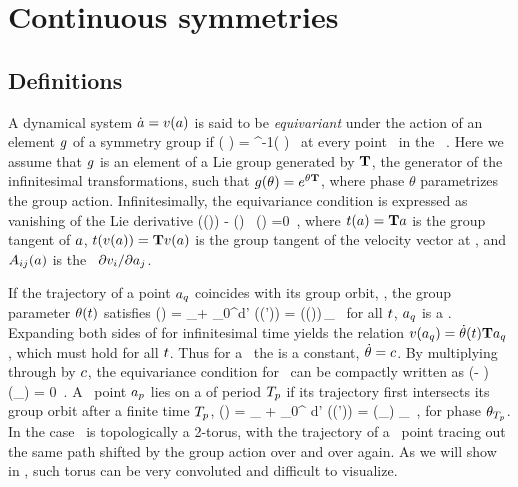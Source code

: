 \section{Continuous symmetries}
\label{s:symm}

\subsection{Definitions}
\label{s:Definitions}

A dynamical system $\dot{a}=v(a)$ is said to be
\emph{equivariant} under the action of an element $g$ of a
symmetry group if
\beq
	\vel( \ssp ) =  \LieEl^{-1}\vel( \LieEl \ssp )
	\,
at every point \ssp\ in the \statesp\ \pS. Here we assume that $g$
is an element of a Lie group generated by $\mathbf{T}$, the generator of the
infinitesimal transformations, such that $g(\theta) = e^{\theta
\mathbf{T}}$, where phase $\theta$ parametrizes the group action.
Infinitesimally, the equivariance condition
 is expressed as vanishing of
the Lie derivative
\beq
  \groupTan(\vel(\ssp))  - \Mvar(\ssp) \, \groupTan(\ssp) =0
  \,,
where
$ t(a) = \mathbf{T} a $ is the group tangent of $a$,
$ t(v(a)) = \mathbf{T} v(a) $ is the group tangent of
the velocity vector at \ssp,
and $A_{ij}(a)$ is the \stabmat\
${\partial v_i}/{\partial a_j}$.

If the trajectory of a point $a_q$ coincides with its group
orbit, \ie, the group parameter $\theta (t)$ satisfies
\beq
\ssp (\zeit)
    = \ssp_\stagn + \int_0^\zeit \!\!d\zeit' \vel(\ssp (\zeit'))
    = \LieEl (\theta (\zeit))\,\ssp_\stagn
  \,
for all $t$, $a_q$ is a \emph{\reqv}. Expanding
both sides of  for infinitesimal time yields the
relation $v(a_q) = \dot{\theta}(t) \mathbf{T} a_q$, which
must hold for all $t$. Thus for a \reqv\ the  \emph{\phaseVel}
is a constant, $\dot{\theta} = c$. By multiplying
through by $c$, the equivariance condition 
for \reqva\ can be compactly written as
\beq
(\velRel \Lg - \Mvar ) \vel (\ssp_\stagn) = 0
\,.
A \statesp\ point $a_{p}$ lies on a \emph{\rpo} of period
${T_{p}}$ if its trajectory first intersects its group orbit after
a finite time ${T_{p}}$,
\beq
\ssp(\period{\rpprime})
    = \ssp_\rpprime
     + \int_0^\period{\rpprime} \!\!\!d\tau' \vel(\ssp (\tau'))
    = \LieEl (\theta_\rpprime ) \ssp_\rpprime
  \,,
for phase $\theta_{T_{p}}$. In the  case \rpo\ is
topologically a 2-torus, with the trajectory of a \rpo\ point tracing out the
same path shifted by the group action over and over again. As we will
show in \refsect{s:numerics}, such torus can be very convoluted and
difficult to visualize.

